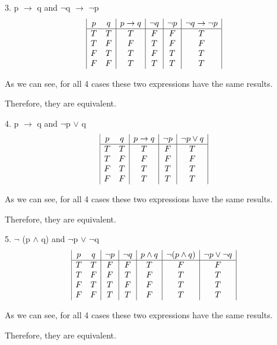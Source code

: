 \documentclass[10pt]{article}
\begin{document}
3. p $\rightarrow$ q  and $\neg$q $\rightarrow$ $\neg$p
\begin{displaymath}
\begin{array}{|c c|c|c|c|c|}
p & q & p \rightarrow q & \neg q & \neg p & \neg q \rightarrow \neg p\\
\hline
T & T & T & F & F & T\\
T & F & F & T & F & F\\
F & T & T & F & T & T\\
F & F & T & T & T & T\\
\end{array}
\end{displaymath}

As we can see, for all 4 cases these two expressions have the same results. 

Therefore, they are equivalent.

4. p $\rightarrow$ q  and $\neg$p $\lor$ q
\begin{displaymath}
\begin{array}{|c c|c|c|c|}
p & q & p \rightarrow q & \neg p & \neg p \lor q\\
\hline
T & T & T & F & T\\
T & F & F & F & F\\
F & T & T & T & T\\
F & F & T & T & T\\
\end{array}
\end{displaymath}

As we can see, for all 4 cases these two expressions have the same results. 

Therefore, they are equivalent.

5. $\neg$ (p $\land$ q) and $\neg$p $\lor$ $\neg$q
\begin{displaymath}
\begin{array}{|c c|c|c|c|c|c|}
p & q & \neg p & \neg q & p \land q & \neg (p \land q) & \neg p \lor \neg q\\
\hline
T & T & F & F & T & F & F\\
T & F & F & T & F & T & T\\
F & T & T & F & F & T & T\\
F & F & T & T & F & T & T\\
\end{array}
\end{displaymath}

As we can see, for all 4 cases these two expressions have the same results. 

Therefore, they are equivalent.
\end{document}
